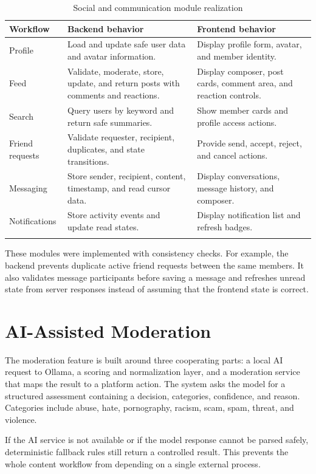 \begin{longtable}{|m{3.4cm}|m{5.3cm}|m{5.4cm}|}
\hline
\textbf{Workflow} & \textbf{Backend behavior} & \textbf{Frontend behavior} \\
\hline
Profile & Load and update safe user data and avatar information. & Display profile form, avatar, and member identity. \\
\hline
Feed & Validate, moderate, store, update, and return posts with comments and reactions. & Display composer, post cards, comment area, and reaction controls. \\
\hline
Search & Query users by keyword and return safe summaries. & Show member cards and profile access actions. \\
\hline
Friend requests & Validate requester, recipient, duplicates, and state transitions. & Provide send, accept, reject, and cancel actions. \\
\hline
Messaging & Store sender, recipient, content, timestamp, and read cursor data. & Display conversations, message history, and composer. \\
\hline
Notifications & Store activity events and update read states. & Display notification list and refresh badges. \\
\hline
\caption{Social and communication module realization}
\end{longtable}

These modules were implemented with consistency checks. For example, the backend prevents duplicate active friend requests between the same members. It also validates message participants before saving a message and refreshes unread state from server responses instead of assuming that the frontend state is correct.

\section{AI-Assisted Moderation}

The moderation feature is built around three cooperating parts: a local AI request to Ollama, a scoring and normalization layer, and a moderation service that maps the result to a platform action. The system asks the model for a structured assessment containing a decision, categories, confidence, and reason. Categories include abuse, hate, pornography, racism, scam, spam, threat, and violence.

If the AI service is not available or if the model response cannot be parsed safely, deterministic fallback rules still return a controlled result. This prevents the whole content workflow from depending on a single external process.

